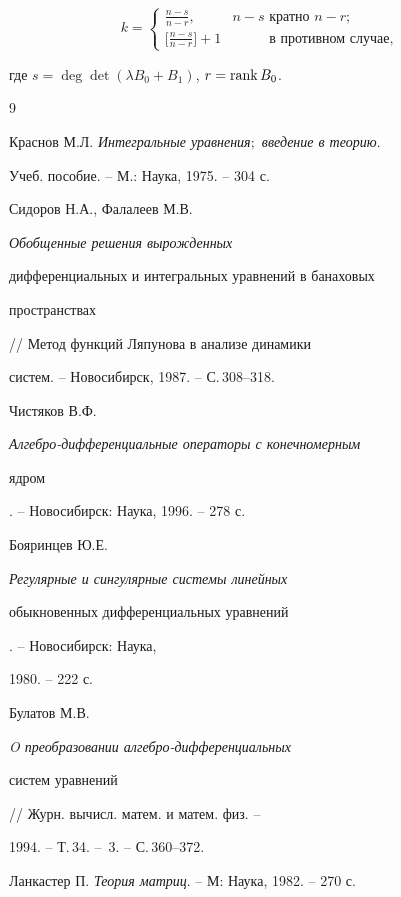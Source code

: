 $$ 


k= 


\begin{cases} 


\displaystyle\frac{n-s}{n-r}, & n-s\text{ кратно }n-r; \\[3mm]


\displaystyle\Big[\frac{n-s}{n-r}\Big]+1 & \phantom{n-s}


\text{ в противном случае}, 


\end{cases} 


$$ 


где $s=\deg\det(\lambda B_0+B_1)$, $r=\operatorname{rank} B_0$. 


 


\begin{thebibliography}{9} 


 




Краснов М.Л. {\em Интегральные уравнения$;$ введение в теорию}.


Учеб. пособие. -- М.: Наука, 1975. -- 304 с. 




Сидоров Н.А., Фалалеев М.В. {\em Обобщенные решения вырожденных 


дифференциальных и интегральных уравнений в банаховых 


пространствах} // Метод функций Ляпунова в анализе динамики 


систем. -- Новосибирск, 1987. -- С.\,308--318. 




Чистяков В.Ф. {\em Алгебро-дифференциальные операторы с конечномерным 


ядром}. -- Новосибирск: Наука, 1996. -- 278 с. 




Бояринцев Ю.Е. {\em Регулярные и сингулярные системы линейных 


обыкновенных дифференциальных уравнений}. -- Новосибирск: Наука, 


1980. -- 222 с. 




Булатов М.В. {\em O преобразовании алгебро-дифференциальных 


систем уравнений} // Журн. вычисл. матем. и матем. физ. -- 


1994. -- Т.\,34. -- \No\,3. -- С.\,360--372. 




Ланкастер П. {\em Теория матриц}. -- М: Наука, 1982. -- 270 с. 


 


\end{thebibliography} 


 


\vskip 0.5cm 


 








 


\label{end} 


 


